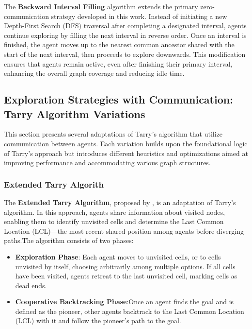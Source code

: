 The \textbf{Backward Interval Filling} algorithm extends the primary zero-communication strategy developed in this work. Instead of initiating a new Depth-First Search (DFS) traversal after completing a designated interval, agents continue exploring by filling the next interval in reverse order. Once an interval is finished, the agent moves up to the nearest common ancestor shared with the start of the next interval, then proceeds to explore downwards. This modification ensures that agents remain active, even after finishing their primary interval, enhancing the overall graph coverage and reducing idle time.

\subsection{Exploration Strategies with Communication: Tarry Algorithm Variations}

\label{section_method_tarry_variations}

This section presents several adaptations of Tarry's algorithm that utilize communication between agents. Each variation builds upon the foundational logic of Tarry's approach but introduces different heuristics and optimizations aimed at improving performance and accommodating various graph structures.

\subsubsection{Extended Tarry Algorith}
\label{section_method_extended_tarry}

The \textbf{Extended Tarry Algorithm}, proposed by , is an adaptation of Tarry's algorithm. In this approach, agents share information about visited nodes, enabling them to identify unvisited cells and determine the Last Common Location (LCL)—the most recent shared position among agents before diverging paths.The algorithm consists of two phases:

\begin{itemize}
    \item \textbf{Exploration Phase}: Each agent moves to unvisited cells, or to cells unvisited by itself, choosing arbitrarily among multiple options. If all cells have been visited, agents retreat to the last unvisited cell, marking cells as dead ends.
    \item \textbf{Cooperative Backtracking Phase}:Once an agent finds the goal and is defined as the pioneer, other agents backtrack to the Last Common Location (LCL) with it and follow the pioneer's path to the goal.
\end{itemize}

